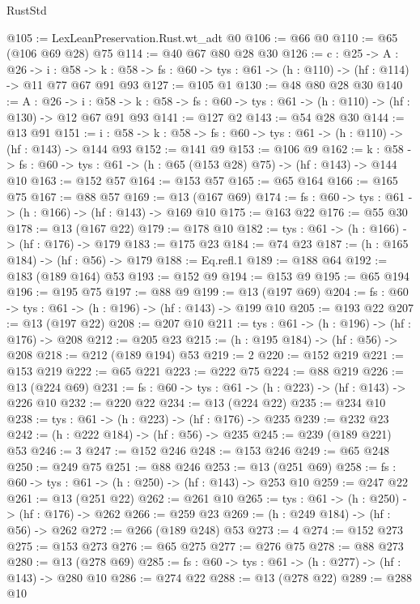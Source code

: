 \begin{lexlean}{RustStd}
\begin{coremodule}
@105 := LexLeanPreservation.Rust.wt_adt @0
@106 := @66 @0
@110 := @65 (@106 @69 @28) @75
@114 := @40 @67 @80 @28 @30
@126 := {c : @25} ->
  {A : @26} ->
  {i : @58} ->
  {k : @58} -> {fs : @60} -> {tys : @61} -> (h : @110) -> (hf : @114) -> @11 @77 @67 @91 @93
@127 := @105 @1
@130 := @48 @80 @28 @30
@140 := {A : @26} ->
  {i : @58} ->
  {k : @58} -> {fs : @60} -> {tys : @61} -> (h : @110) -> (hf : @130) -> @12 @67 @91 @93
@141 := @127 @2
@143 := @54 @28 @30
@144 := @13 @91
@151 := {i : @58} -> {k : @58} -> {fs : @60} -> {tys : @61} -> (h : @110) -> (hf : @143) -> @144 @93
@152 := @141 @9
@153 := @106 @9
@162 := {k : @58} ->
  {fs : @60} -> {tys : @61} -> (h : @65 (@153 @28) @75) -> (hf : @143) -> @144 @10
@163 := @152 @57
@164 := @153 @57
@165 := @65 @164
@166 := @165 @75
@167 := @88 @57
@169 := @13 (@167 @69)
@174 := {fs : @60} -> {tys : @61} -> (h : @166) -> (hf : @143) -> @169 @10
@175 := @163 @22
@176 := @55 @30
@178 := @13 (@167 @22)
@179 := @178 @10
@182 := {tys : @61} -> (h : @166) -> (hf : @176) -> @179
@183 := @175 @23
@184 := @74 @23
@187 := (h : @165 @184) -> (hf : @56) -> @179
@188 := Eq.refl.{1}
@189 := @188 @64
@192 := @183 (@189 @164) @53
@193 := @152 @9
@194 := @153 @9
@195 := @65 @194
@196 := @195 @75
@197 := @88 @9
@199 := @13 (@197 @69)
@204 := {fs : @60} -> {tys : @61} -> (h : @196) -> (hf : @143) -> @199 @10
@205 := @193 @22
@207 := @13 (@197 @22)
@208 := @207 @10
@211 := {tys : @61} -> (h : @196) -> (hf : @176) -> @208
@212 := @205 @23
@215 := (h : @195 @184) -> (hf : @56) -> @208
@218 := @212 (@189 @194) @53
@219 := 2
@220 := @152 @219
@221 := @153 @219
@222 := @65 @221
@223 := @222 @75
@224 := @88 @219
@226 := @13 (@224 @69)
@231 := {fs : @60} -> {tys : @61} -> (h : @223) -> (hf : @143) -> @226 @10
@232 := @220 @22
@234 := @13 (@224 @22)
@235 := @234 @10
@238 := {tys : @61} -> (h : @223) -> (hf : @176) -> @235
@239 := @232 @23
@242 := (h : @222 @184) -> (hf : @56) -> @235
@245 := @239 (@189 @221) @53
@246 := 3
@247 := @152 @246
@248 := @153 @246
@249 := @65 @248
@250 := @249 @75
@251 := @88 @246
@253 := @13 (@251 @69)
@258 := {fs : @60} -> {tys : @61} -> (h : @250) -> (hf : @143) -> @253 @10
@259 := @247 @22
@261 := @13 (@251 @22)
@262 := @261 @10
@265 := {tys : @61} -> (h : @250) -> (hf : @176) -> @262
@266 := @259 @23
@269 := (h : @249 @184) -> (hf : @56) -> @262
@272 := @266 (@189 @248) @53
@273 := 4
@274 := @152 @273
@275 := @153 @273
@276 := @65 @275
@277 := @276 @75
@278 := @88 @273
@280 := @13 (@278 @69)
@285 := {fs : @60} -> {tys : @61} -> (h : @277) -> (hf : @143) -> @280 @10
@286 := @274 @22
@288 := @13 (@278 @22)
@289 := @288 @10

\end{coremodule}
\end{lexlean}
